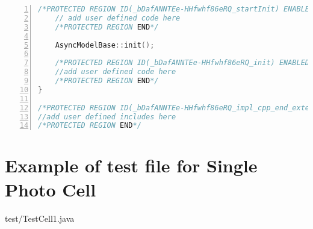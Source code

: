 \begin{appendices}
\begin{lstlisting}[frame=single,
numbers=left, basicstyle=\tiny, language = C++]
	/*PROTECTED REGION ID(_bDafANNTEe-HHfwhf86eRQ_startInit) ENABLED START*/
	// add user defined code here
	/*PROTECTED REGION END*/

	AsyncModelBase::init();

	/*PROTECTED REGION ID(_bDafANNTEe-HHfwhf86eRQ_init) ENABLED START*/
	//add user defined code here
	/*PROTECTED REGION END*/
}

/*PROTECTED REGION ID(_bDafANNTEe-HHfwhf86eRQ_impl_cpp_end_extensionsimplementation) ENABLED START*/
//add user defined includes here
/*PROTECTED REGION END*/

\end{lstlisting}


\newpage
\section{Example of test file for Single Photo Cell}
\label{sec:test_example}


{test/TestCell1.java}

\end{appendices}
